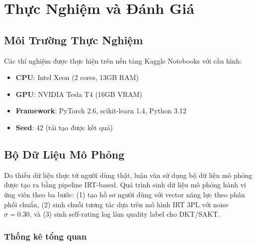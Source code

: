 \chapter{Thực Nghiệm và Đánh Giá}
\label{chap:experiment}

\section{Môi Trường Thực Nghiệm}
\label{sec:env}

Các thí nghiệm được thực hiện trên nền tảng Kaggle Notebooks với cấu hình:
\begin{itemize}
  \item \textbf{CPU}: Intel Xeon (2 cores, 13GB RAM)
  \item \textbf{GPU}: NVIDIA Tesla T4 (16GB VRAM)
  \item \textbf{Framework}: PyTorch 2.6, scikit-learn 1.4, Python 3.12
  \item \textbf{Seed}: 42 (tái tạo được kết quả)
\end{itemize}

\section{Bộ Dữ Liệu Mô Phỏng}
\label{sec:dataset}

Do thiếu dữ liệu thực từ người dùng thật, luận văn sử dụng bộ dữ liệu mô phỏng được tạo ra bằng pipeline IRT-based. Quá trình sinh dữ liệu mô phỏng hành vi ứng viên theo ba bước: (1) tạo hồ sơ người dùng với vector năng lực theo phân phối chuẩn, (2) sinh chuỗi tương tác dựa trên mô hình IRT 3PL với noise $\sigma = 0.30$, và (3) sinh self-rating log làm quality label cho DKT/SAKT.

\subsection{Thống kê tổng quan}

